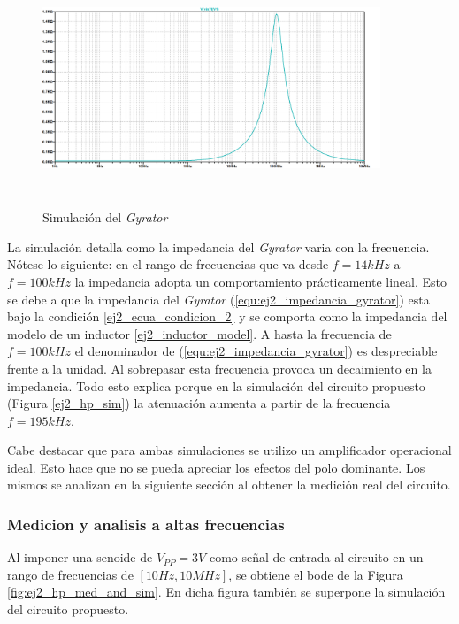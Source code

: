 \documentclass[12pt,a4paper]{article}
\begin{document}
\begin{figure}[h!]                                                       
    \centering\includegraphics[width=0.9\textwidth, height=7cm]{Resources/ej2_hp_gyrator_sim.png}
    \caption{Simulación del \textit{Gyrator} }
    \label{fig:ej2_HP_gyrator_sim}
    \end{figure}

La simulación detalla como la impedancia del \textit{Gyrator} varia con la frecuencia. Nótese lo siguiente: en el rango de frecuencias que va desde $f = 14 kHz$ a $f = 100 kHz$ la impedancia adopta un comportamiento prácticamente lineal. Esto se debe a que la impedancia del \textit{Gyrator} (\ref{equ:ej2_impedancia_gyrator}) esta bajo la condición \ref{ej2_ecua_condicion_2} y se comporta como la impedancia del modelo de un inductor \ref{ej2_inductor_model}. A hasta la frecuencia de $f=100kHz$ el denominador de (\ref{equ:ej2_impedancia_gyrator}) es despreciable frente a la unidad. Al sobrepasar esta frecuencia provoca un decaimiento en la impedancia. Todo esto explica porque en la simulación del circuito propuesto (Figura \ref{ej2_hp_sim}) la atenuación aumenta a partir de la frecuencia $f = 195 kHz$. 

Cabe destacar que para ambas simulaciones se utilizo un amplificador operacional ideal. Esto hace que no se pueda apreciar los efectos del polo dominante. Los mismos se analizan en la siguiente sección al obtener la medición real del circuito. 

\subsubsection{Medicion y analisis a altas frecuencias}

Al imponer una senoide de $V_{PP} = 3V$ como señal de entrada al circuito en un rango de frecuencias de $[10Hz , 10MHz]$, se obtiene el bode de la Figura \ref{fig:ej2_hp_med_and_sim}. En dicha figura también se superpone la simulación del circuito propuesto.  
\end{document}
